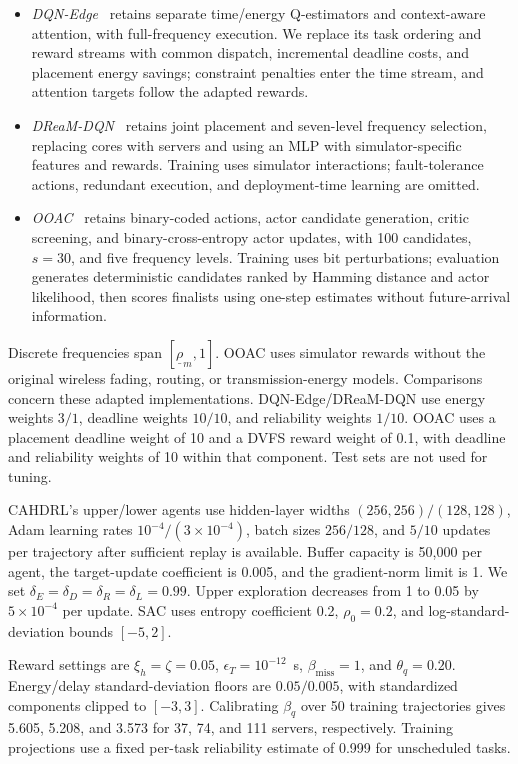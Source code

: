 \documentclass[journal]{IEEEtran}
\begin{document}
\begin{itemize}
\item \emph{DQN-Edge}~\cite{wen2026} retains separate time/energy Q-estimators and context-aware attention, with full-frequency execution. We replace its task ordering and reward streams with common dispatch, incremental deadline costs, and placement energy savings; constraint penalties enter the time stream, and attention targets follow the adapted rewards.

\item \emph{DReaM-DQN}~\cite{esnaashari2025dream} retains joint placement and seven-level frequency selection, replacing cores with servers and using an MLP with simulator-specific features and rewards. Training uses simulator interactions; fault-tolerance actions, redundant execution, and deployment-time learning are omitted.

\item \emph{OOAC}~\cite{wang2025ordinal} retains binary-coded actions, actor candidate generation, critic screening, and binary-cross-entropy actor updates, with 100 candidates, $s=30$, and five frequency levels. Training uses bit perturbations; evaluation generates deterministic candidates ranked by Hamming distance and actor likelihood, then scores finalists using one-step estimates without future-arrival information.
\end{itemize}

Discrete frequencies span $[\underline\rho_m,1]$. OOAC uses simulator rewards without the original wireless fading, routing, or transmission-energy models. Comparisons concern these adapted implementations. DQN-Edge/DReaM-DQN use energy weights $3/1$, deadline weights $10/10$, and reliability weights $1/10$. OOAC uses a placement deadline weight of 10 and a DVFS reward weight of 0.1, with deadline and reliability weights of 10 within that component. Test sets are not used for tuning.

CAHDRL's upper/lower agents use hidden-layer widths $(256,256)/(128,128)$, Adam learning rates $10^{-4}/(3\times10^{-4})$, batch sizes $256/128$, and $5/10$ updates per trajectory after sufficient replay is available. Buffer capacity is 50,000 per agent, the target-update coefficient is 0.005, and the gradient-norm limit is 1. We set $\delta_E=\delta_D=\delta_R=\delta_L=0.99$. Upper exploration decreases from 1 to 0.05 by $5\times10^{-4}$ per update. SAC uses entropy coefficient 0.2, $\rho_0=0.2$, and log-standard-deviation bounds $[-5,2]$.

Reward settings are $\xi_h=\zeta=0.05$, $\epsilon_T=10^{-12}$~s, $\beta_{\mathrm{miss}}=1$, and $\theta_q=0.20$. Energy/delay standard-deviation floors are $0.05/0.005$, with standardized components clipped to $[-3,3]$. Calibrating $\beta_q$ over 50 training trajectories gives 5.605, 5.208, and 3.573 for 37, 74, and 111 servers, respectively. Training projections use a fixed per-task reliability estimate of 0.999 for unscheduled tasks.
\end{document}
